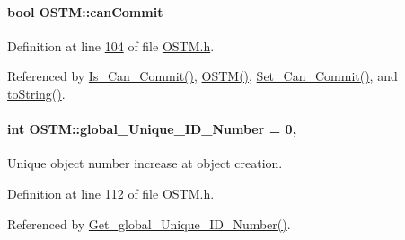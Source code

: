 \paragraph[{\texorpdfstring{can\+Commit}{canCommit}}]{\setlength{\rightskip}{0pt plus 5cm}bool O\+S\+T\+M\+::can\+Commit\hspace{0.3cm}{\ttfamily [private]}}\hypertarget{class_o_s_t_m_a2a5b89641af274ddc69bdf8c1c1a07d6_a2a5b89641af274ddc69bdf8c1c1a07d6}{}\label{class_o_s_t_m_a2a5b89641af274ddc69bdf8c1c1a07d6_a2a5b89641af274ddc69bdf8c1c1a07d6}


Definition at line \hyperlink{_o_s_t_m_8h_source_l00104}{104} of file \hyperlink{_o_s_t_m_8h_source}{O\+S\+T\+M.\+h}.



Referenced by \hyperlink{_o_s_t_m_8cpp_source_l00112}{Is\+\_\+\+Can\+\_\+\+Commit()}, \hyperlink{_o_s_t_m_8cpp_source_l00020}{O\+S\+T\+M()}, \hyperlink{_o_s_t_m_8cpp_source_l00105}{Set\+\_\+\+Can\+\_\+\+Commit()}, and \hyperlink{_o_s_t_m_8h_source_l00042}{to\+String()}.

\paragraph[{\texorpdfstring{global\+\_\+\+Unique\+\_\+\+I\+D\+\_\+\+Number}{global_Unique_ID_Number}}]{\setlength{\rightskip}{0pt plus 5cm}int O\+S\+T\+M\+::global\+\_\+\+Unique\+\_\+\+I\+D\+\_\+\+Number = 0\hspace{0.3cm}{\ttfamily [static]}, {\ttfamily [private]}}\hypertarget{class_o_s_t_m_acb617b9666d198c0de333c8613df0d4b_acb617b9666d198c0de333c8613df0d4b}{}\label{class_o_s_t_m_acb617b9666d198c0de333c8613df0d4b_acb617b9666d198c0de333c8613df0d4b}


Unique object number increase at object creation. 



Definition at line \hyperlink{_o_s_t_m_8h_source_l00112}{112} of file \hyperlink{_o_s_t_m_8h_source}{O\+S\+T\+M.\+h}.



Referenced by \hyperlink{_o_s_t_m_8cpp_source_l00056}{Get\+\_\+global\+\_\+\+Unique\+\_\+\+I\+D\+\_\+\+Number()}.

